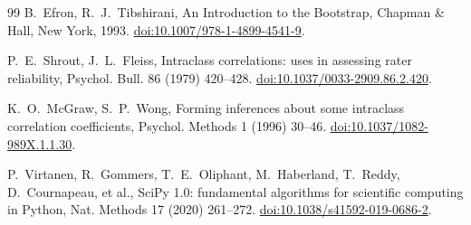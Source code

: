 \documentclass[preprint,12pt]{elsarticle}
\begin{document}
\begin{thebibliography}{99}
B.~Efron, R.~J.~Tibshirani,
An Introduction to the Bootstrap,
Chapman \& Hall, New York, 1993.
\href{https://doi.org/10.1007/978-1-4899-4541-9}{doi:10.1007/978-1-4899-4541-9}.

P.~E.~Shrout, J.~L.~Fleiss,
Intraclass correlations: uses in assessing rater reliability,
Psychol. Bull. 86 (1979) 420--428.
\href{https://doi.org/10.1037/0033-2909.86.2.420}{doi:10.1037/0033-2909.86.2.420}.

K.~O.~McGraw, S.~P.~Wong,
Forming inferences about some intraclass correlation coefficients,
Psychol. Methods 1 (1996) 30--46.
\href{https://doi.org/10.1037/1082-989X.1.1.30}{doi:10.1037/1082-989X.1.1.30}.

P.~Virtanen, R.~Gommers, T.~E.~Oliphant, M.~Haberland, T.~Reddy, D.~Cournapeau, et al.,
SciPy 1.0: fundamental algorithms for scientific computing in Python,
Nat. Methods 17 (2020) 261--272.
\href{https://doi.org/10.1038/s41592-019-0686-2}{doi:10.1038/s41592-019-0686-2}.

\end{thebibliography}
\end{document}
